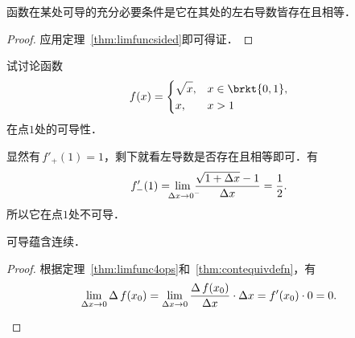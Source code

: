 \begin{theorem}
  \label{thm:derivsided}
  函数在某处可导的充分必要条件是它在其处的左右导数皆存在且相等．

  \begin{proof}
    应用定理~\ref{thm:limfuncsided}即可得证．
  \end{proof}
\end{theorem}

\begin{example*}
  试讨论函数
  \begin{equation*}
    f(x) =
    \begin{dcases}
      \sqrt{x\mathstrut}, & x \in \brkt{0,1}, \\
      x, & x > 1
    \end{dcases}
  \end{equation*}
  在点\(1\)处的可导性．

  \begin{remark}
    显然有\(\,f'_+(1) = 1\)，剩下就看左导数是否存在且相等即可．有
    \begin{equation*}
      f'_-(1)
      = \,\lim_{\mathclap{\,\fdx \to 0^-\!}} \,\frac{\sqrt{1+\fdx} - 1}{\fdx}
      = \frac12.
    \end{equation*}
    所以它在点\(1\)处不可导．
  \end{remark}
\end{example*}

\begin{theorem}
  \label{thm:deriv2cont}
  可导蕴含连续．


  \begin{proof}
    根据定理~\ref{thm:limfunc4ops}和~\ref{thm:contequivdefn}，有
    \begin{equation*}
      \lim_{\fdx \to 0} \fwdf\,f(x_0)
      = \lim_{\fdx \to 0} \frac{\fwdf\,f(x_0)}{\fdx} \cdot \fdx
      = f'(x_0) \cdot 0 = 0. \rule[-2.5ex]{0ex}{0ex}
      \qedhere
    \end{equation*}
  \end{proof}
\end{theorem}

